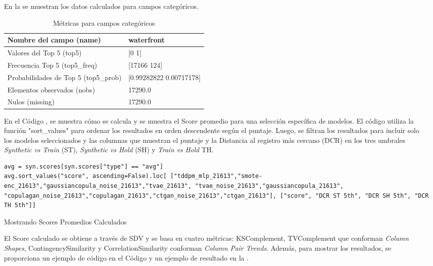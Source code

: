\newpage
En la  se muestran los datos calculados para campos categóricos.

\begin{table}[H]
    \centering
    \caption{Métricas para campos categóricos}
    \label{metricas-categoricas}
    \begin{tabular}{|m{10em}|m{25em}|}
        \hline
        \rowcolor[gray]{0.8}
        Nombre del campo (name) & waterfront \\ \hline
        Valores del Top 5 (top5) & [0 1] \\ \hline
        Frecuencia Top 5 (top5\_freq) & [17166   124] \\ \hline
        Probabilidades de Top 5 (top5\_prob) & [0.99282822 0.00717178] \\ \hline
        Elementos observados (nobs) & 17290.0 \\ \hline
        Nulos (missing) & 17290.0 \\ \hline
    \end{tabular}
\end{table}
\newpage
En el Código , se muestra cómo se calcula y se muestra el Score promedio para una selección específica de modelos. El código utiliza la función "sort\_values" para ordenar los resultados en orden descendente según el puntaje. Luego, se filtran los resultados para incluir solo los modelos seleccionados y las columnas que muestran el puntaje y la Distancia al registro más cercano (DCR) en los tres umbrales \emph{Synthetic vs Train} (ST), \emph{Synthetic vs Hold} (SH) y \emph{Train vs Hold} TH.
\begin{listing}[H]
    \begin{verbatim}
avg = syn.scores[syn.scores["type"] == "avg"]
avg.sort_values("score", ascending=False).loc[ ["tddpm_mlp_21613","smote-enc_21613","gaussiancopula_noise_21613","tvae_21613", "tvae_noise_21613","gaussiancopula_21613", "copulagan_noise_21613","copulagan_21613","ctgan_noise_21613","ctgan_21613"], ["score", "DCR ST 5th", "DCR SH 5th", "DCR TH 5th"]]
    \end{verbatim}
\caption{Mostrando Scores Promedios Calculados}
\label{codigo-show-score}
\end{listing}

El Score calculado se obtiene a través de SDV y se basa en cuatro métricas: KSComplement, TVComplement que conforman \emph{Column Shapes}, ContingencySimilarity y CorrelationSimilarity conforman \emph{Column Pair Trends}. Además, para mostrar los resultados, se proporciona un ejemplo de código en el Código  y un ejemplo de resultado en la .

